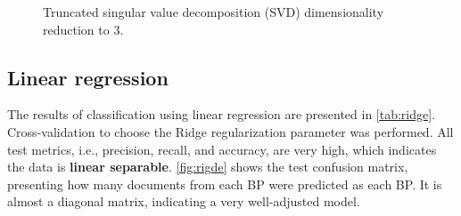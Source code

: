 \documentclass[twocolumn]{article}
\begin{document}
                  \begin{figure}[!h]
                        \centering
                        \qquad
                        \caption{Truncated singular value decomposition (SVD) dimensionality reduction to 3.}
                        \label{fig:svd_2_3}
                  \end{figure}

            \subsection{Linear regression}

                  The results of classification using linear regression are presented in \autoref{tab:ridge}. Cross-validation to choose the Ridge regularization parameter was performed. All test metrics, i.e., precision, recall, and accuracy, are very high, which indicates the data is \textbf{linear separable}. \autoref{fig:rigde} shows the test confusion matrix, presenting how many documents from each BP were predicted as each BP. It is almost a diagonal matrix, indicating a very well-adjusted model.
\end{document}
